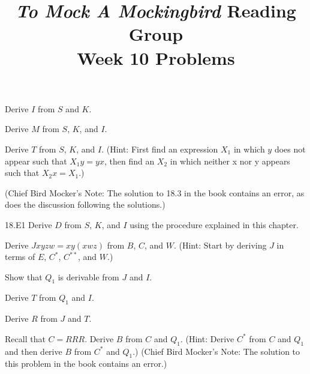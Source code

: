 \documentclass[12pt, letterpaper]{article}
\title{\emph{To Mock A Mockingbird} Reading Group\\Week 10 Problems}
\begin{document}
\maketitle
\setcounter{section}{18}

\disclaimer

\begin{prob}{18.1}  
Derive $I$ from $S$ and $K$.
\end{prob}

\begin{prob}{18.2}  
Derive $M$ from $S$, $K$, and $I$.
\end{prob}

\begin{prob}{18.3}  
Derive $T$ from $S$, $K$, and $I$. (Hint: First find an expression $X_1$ in which $y$ does not appear such that $X_1y = yx$, then find an $X_2$ in which neither x nor y appears such that $X_2x = X_1$.)
\end{prob}

\noindent(Chief Bird Mocker's Note: The solution to 18.3 in the book contains an error, as does the discussion following the solutions.)

\begin{prob}{18.E1} 
Derive $D$ from $S$, $K$, and $I$ using the procedure explained in this chapter.
\end{prob}

\begin{prob}{19.1}  
Derive $Jxyzw = xy(xwz)$ from $B$, $C$, and $W$. (Hint: Start by deriving $J$ in terms of $E$, $C^*$, $C^{**}$, and $W$.)
\end{prob}

\begin{prob}{19.2}  
Show that $Q_1$ is derivable from $J$ and $I$.
\end{prob}

\begin{prob}{19.3}  
Derive $T$ from $Q_1$ and $I$.
\end{prob}

\begin{prob}{19.4}  
Derive $R$ from $J$ and $T$.
\end{prob}

\begin{prob}{19.5}  
Recall that $C = RRR$. Derive $B$ from $C$ and $Q_1$. (Hint: Derive $C^*$ from $C$ and $Q_1$ and then derive $B$ from $C^*$ and $Q_1$.) (Chief Bird Mocker's Note: The solution to this problem in the book contains an error.)
\end{prob}
\end{document}
